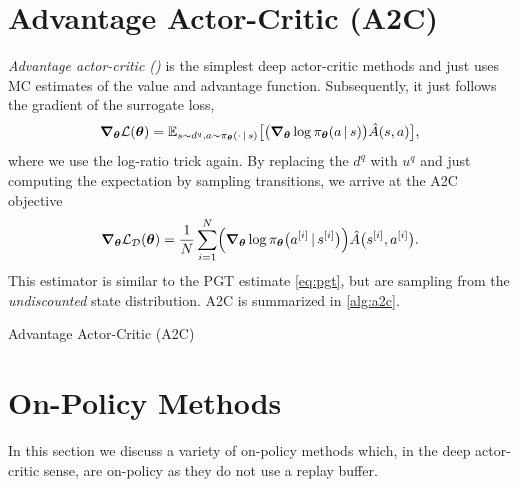 	\section{Advantage Actor-Critic (\acs{A2C})}
		\emph{Advantage actor-critic ()} is the simplest deep actor-critic methods and just uses \ac{MC} estimates of the value and advantage function. Subsequently, it just follows the gradient of the surrogate loss,
		\begin{equation}
			\grad_{\bm{\theta}} \mathcal{L}(\bm{\theta})
				= \mathbb{E}_{s \sim d^q, a \sim \pi_{\bm{\theta}}(\cdot \,\vert\, s)}\bigl[ \bigl( \grad_{\bm{\theta}} \log \pi_{\bm{\theta}}(a \,\vert\, s) \bigr) \hat{A}(s, a) \bigr],
		\end{equation}
		where we use the log-ratio trick again. By replacing the \(d^q\) with \(u^q\) and just computing the expectation by sampling transitions, we arrive at the \ac{A2C} objective
		\begin{equation}
			\grad_{\bm{\theta}} \mathcal{L}_\mathcal{D}(\bm{\theta}) = \frac{1}{N} \sum_{i = 1}^{N} \Bigl( \grad_{\bm{\theta}} \log \pi_{\bm{\theta}}\bigl(a^{[i]} \,\vert\, s^{[i]}\bigr) \Bigr) \hat{A}\bigl(s^{[i]}, a^{[i]}\bigr).
		\end{equation}
		This estimator is similar to the \ac{PGT} estimate \eqref{eq:pgt}, but are sampling from the \emph{undiscounted} state distribution. \ac{A2C} is summarized in \autoref{alg:a2c}.

		\begin{algorithm}  \DontPrintSemicolon
			 \;
			\caption{Advantage Actor-Critic (\acs{A2C})}
			\label{alg:a2c}
		\end{algorithm}

	\section{On-Policy Methods}
		In this section we discuss a variety of on-policy methods which, in the deep actor-critic sense, are on-policy as they do not use a replay buffer.

